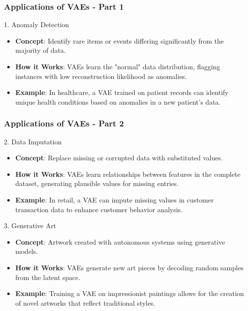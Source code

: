 \documentclass[aspectratio=169]{beamer}
\begin{document}
\begin{frame}[fragile]
    \frametitle{Applications of VAEs - Part 1}
    \begin{block}{1. Anomaly Detection}
        \begin{itemize}
            \item \textbf{Concept}: Identify rare items or events differing significantly from the majority of data.
            \item \textbf{How it Works}: VAEs learn the "normal" data distribution, flagging instances with low reconstruction likelihood as anomalies.
            \item \textbf{Example}: In healthcare, a VAE trained on patient records can identify unique health conditions based on anomalies in a new patient's data.
        \end{itemize}
    \end{block}
\end{frame}

\begin{frame}[fragile]
    \frametitle{Applications of VAEs - Part 2}
    \begin{block}{2. Data Imputation}
        \begin{itemize}
            \item \textbf{Concept}: Replace missing or corrupted data with substituted values.
            \item \textbf{How it Works}: VAEs learn relationships between features in the complete dataset, generating plausible values for missing entries.
            \item \textbf{Example}: In retail, a VAE can impute missing values in customer transaction data to enhance customer behavior analysis.
        \end{itemize}
    \end{block}

    \begin{block}{3. Generative Art}
        \begin{itemize}
            \item \textbf{Concept}: Artwork created with autonomous systems using generative models.
            \item \textbf{How it Works}: VAEs generate new art pieces by decoding random samples from the latent space.
            \item \textbf{Example}: Training a VAE on impressionist paintings allows for the creation of novel artworks that reflect traditional styles.
        \end{itemize}
    \end{block}
\end{frame}
\end{document}
